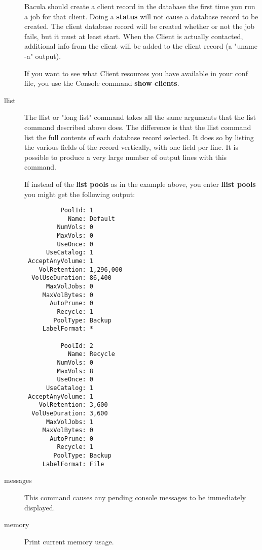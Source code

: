 \begin{description}
   Bacula should create a client record in the database the first time you
   run a job for that client.  Doing a {\bf status} will not cause a
   database record to be created.  The client database record will be
   created whether or not the job fails, but it must at least start.  When
   the Client is actually contacted, additional info from the client will
   be added to the client record (a "uname -a" output).

   If you want to see what Client resources you have available in your conf
   file, you use the Console command {\bf show clients}.

\item [llist]
   The llist or "long list" command takes all the same arguments that the
   list command described above does.  The difference is that the llist
   command list the full contents of each database record selected.  It
   does so by listing the various fields of the record vertically, with one
   field per line.  It is possible to produce a very large number of output
   lines with this command.

   If instead of the {\bf list pools} as in the example above, you enter
   {\bf llist pools} you might get the following output:

\footnotesize
\begin{verbatim}
          PoolId: 1
            Name: Default
         NumVols: 0
         MaxVols: 0
         UseOnce: 0
      UseCatalog: 1
 AcceptAnyVolume: 1
    VolRetention: 1,296,000
  VolUseDuration: 86,400
      MaxVolJobs: 0
     MaxVolBytes: 0
       AutoPrune: 0
         Recycle: 1
        PoolType: Backup
     LabelFormat: *

          PoolId: 2
            Name: Recycle
         NumVols: 0
         MaxVols: 8
         UseOnce: 0
      UseCatalog: 1
 AcceptAnyVolume: 1
    VolRetention: 3,600
  VolUseDuration: 3,600
      MaxVolJobs: 1
     MaxVolBytes: 0
       AutoPrune: 0
         Recycle: 1
        PoolType: Backup
     LabelFormat: File

\end{verbatim}
\normalsize

\item [messages]
   This command causes any pending  console messages to be immediately displayed.

\item [memory]
   Print current memory usage.



\end{description}
